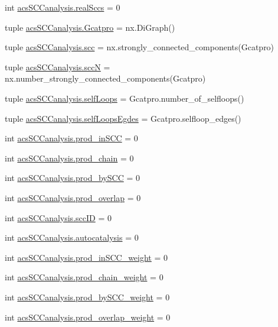 \begin{DoxyCompactItemize}
\item 
int \hyperlink{a00096_ac6aaa0ac5d13b0736ab3179dc1ed388d}{acs\-S\-C\-Canalysis.\-real\-Sccs} = 0
\item 
tuple \hyperlink{a00096_ad88c3dd8eb89ddbe8720462b03f35003}{acs\-S\-C\-Canalysis.\-Gcatpro} = nx.\-Di\-Graph()
\item 
tuple \hyperlink{a00096_a2094b7f0917a16a948a2d1c4d700e84c}{acs\-S\-C\-Canalysis.\-scc} = nx.\-strongly\-\_\-connected\-\_\-components(Gcatpro)
\item 
tuple \hyperlink{a00096_a185cbf8ef1ec67f52695562582418793}{acs\-S\-C\-Canalysis.\-scc\-N} = nx.\-number\-\_\-strongly\-\_\-connected\-\_\-components(Gcatpro)
\item 
tuple \hyperlink{a00096_a8fec45ae9b70981ce94eaeed14d888b1}{acs\-S\-C\-Canalysis.\-self\-Loops} = Gcatpro.\-number\-\_\-of\-\_\-selfloops()
\item 
tuple \hyperlink{a00096_ad34596e89eef2cfb696f61a810765c7a}{acs\-S\-C\-Canalysis.\-self\-Loops\-Egdes} = Gcatpro.\-selfloop\-\_\-edges()
\item 
int \hyperlink{a00096_adbc76b0558ceb74d798b35146a583474}{acs\-S\-C\-Canalysis.\-prod\-\_\-in\-S\-C\-C} = 0
\item 
int \hyperlink{a00096_ab307c6047e4d16ec0335266b24e7db5a}{acs\-S\-C\-Canalysis.\-prod\-\_\-chain} = 0
\item 
int \hyperlink{a00096_abb2ac92624837ae48b882d145c5aab11}{acs\-S\-C\-Canalysis.\-prod\-\_\-by\-S\-C\-C} = 0
\item 
int \hyperlink{a00096_a213e964195f0666d00663ca874a09caa}{acs\-S\-C\-Canalysis.\-prod\-\_\-overlap} = 0
\item 
int \hyperlink{a00096_a1dd3c43841ba4485a66889600f099a0c}{acs\-S\-C\-Canalysis.\-scc\-I\-D} = 0
\item 
int \hyperlink{a00096_a70ccd5d519e878c6c8a7d0aa73caf46c}{acs\-S\-C\-Canalysis.\-autocatalysis} = 0
\item 
int \hyperlink{a00096_aa22adccedd9ae548d0687df507ebd92d}{acs\-S\-C\-Canalysis.\-prod\-\_\-in\-S\-C\-C\-\_\-weight} = 0
\item 
int \hyperlink{a00096_a6736365f1f19058f6e1d57287383dbcc}{acs\-S\-C\-Canalysis.\-prod\-\_\-chain\-\_\-weight} = 0
\item 
int \hyperlink{a00096_a5f45dbe461b3b18021c93780e87cc40e}{acs\-S\-C\-Canalysis.\-prod\-\_\-by\-S\-C\-C\-\_\-weight} = 0
\item 
int \hyperlink{a00096_ab78b07d6cd1a94356c4fee43dfc1272a}{acs\-S\-C\-Canalysis.\-prod\-\_\-overlap\-\_\-weight} = 0

\end{DoxyCompactItemize}
